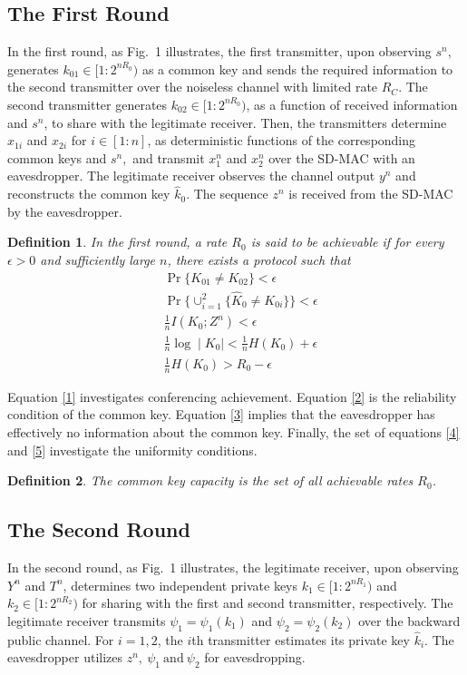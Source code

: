 \documentclass[conference,8pt]{IEEEtran}
\newtheorem{th2}{Definition}
\begin{document}
{{\subsection{The First Round}{
In the first round, as Fig.~1 illustrates, the first transmitter, upon observing $s^n$, generates ${k_{01} \in {[1:2^{nR_0})}}$ as a common key and sends the required information to the second transmitter over the noiseless channel with limited rate $R_C$. The second transmitter generates ${k_{02} \in {[1:2^{nR_0})}}$, as a function of received information and $s^n$, to share with the legitimate receiver. Then, the transmitters determine $x_{1i}$ and $x_{2i}$ for ${i \in [1:n]}$, as deterministic functions of the corresponding common keys and $s^n,$ and transmit $x^n_1$ and $x^n_2$ over the SD-MAC with an eavesdropper. The legitimate receiver observes the channel output $y^n$ and reconstructs the common key $\hat{k}_{0}$. The sequence $z^n$ is received from the SD-MAC by the eavesdropper. 

\begin{th2}
In the first round, a rate $R_0$ is said to be achievable if for every $\epsilon > 0$ and sufficiently large $n$, there exists a protocol such that
\begin{align}
&\Pr \{ K_{01} \neq K_{02} \} < \epsilon \label{1} \\
&\Pr \{\cup_{i=1}^2 \{ \hat{K}_{0} \neq K_{0i} \} \} < \epsilon \label{2}\\
&\frac{1}{n} I(K_0;Z^n) < \epsilon \label{3} \\
&\frac{1}{n} \log \mid K_0 \mid < \frac{1}{n} H(K_0) + \epsilon \label{4} \\
&\frac{1}{n} H(K_0) > R_0 - \epsilon \label{5}
\end{align}
\end{th2}
Equation \eqref{1} investigates conferencing achievement. Equation \eqref{2} is the reliability condition of the common key. Equation \eqref{3} implies that the eavesdropper has effectively no information about the common key. Finally, the set of equations \eqref{4} and \eqref{5} investigate the uniformity conditions.
\begin{th2}
The common key capacity is the set of all achievable rates $R_0$.
\end{th2}
}
\subsection{The Second Round}{
In the second round, as Fig.~1 illustrates, the legitimate receiver, upon observing $Y^n$ and $T^n$, determines two independent private keys ${k_{1} \in [1:2^{nR_1})}$ and ${k_{2} \in [1:2^{nR_2})}$ for sharing with the first and second transmitter, respectively. The legitimate receiver transmits ${\psi_{1}=\psi_{1}(k_1)}$ and ${\psi_{2}=\psi_{2}(k_2)}$ over the backward public channel. For ${i = 1,2}$, the $i$th transmitter estimates its private key $\hat{k}_i$. The eavesdropper utilizes $z^n, \ \psi_{1} \ \text{and} \ \psi_{2}$ for eavesdropping.

}}}
\end{document}
